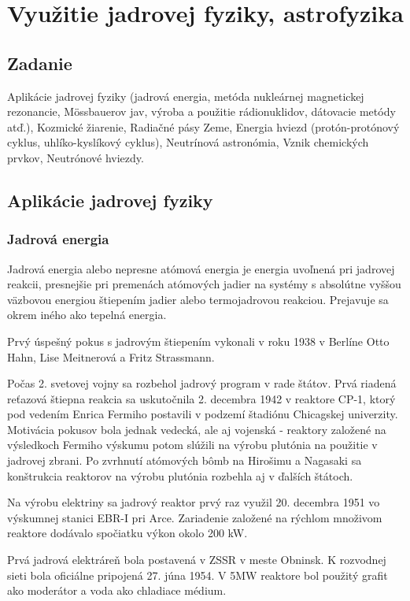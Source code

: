 \documentclass[../../main.tex]{subfiles}
\begin{document}
\chapter{Využitie jadrovej fyziky, astrofyzika}

\section{Zadanie}

Aplikácie jadrovej fyziky (jadrová energia, metóda nukleárnej magnetickej rezonancie, Mössbauerov jav, výroba a použitie rádionuklidov, dátovacie metódy atď.), Kozmické žiarenie, Radiačné pásy Zeme, Energia hviezd (protón-protónový cyklus, uhlíko-kyslíkový cyklus), Neutrínová astronómia, Vznik chemických prvkov, Neutrónové hviezdy.

\section{Aplikácie jadrovej fyziky}

\subsection{Jadrová energia}

Jadrová energia alebo nepresne atómová energia je energia uvoľnená pri jadrovej reakcii, presnejšie pri premenách atómových jadier na systémy s absolútne vyššou väzbovou energiou štiepením jadier alebo termojadrovou reakciou. Prejavuje sa okrem iného ako tepelná energia.

Prvý úspešný pokus s jadrovým štiepením vykonali v roku 1938 v Berlíne Otto Hahn, Lise Meitnerová a Fritz Strassmann.

Počas 2. svetovej vojny sa rozbehol jadrový program v rade štátov. Prvá riadená reťazová štiepna reakcia sa uskutočnila 2. decembra 1942 v reaktore CP-1, ktorý pod vedením Enrica Fermiho postavili v podzemí štadiónu Chicagskej univerzity. Motivácia pokusov bola jednak vedecká, ale aj vojenská - reaktory založené na výsledkoch Fermiho výskumu potom slúžili na výrobu plutónia na použitie v jadrovej zbrani. Po zvrhnutí atómových bômb na Hirošimu a Nagasaki sa konštrukcia reaktorov na výrobu plutónia rozbehla aj v ďalších štátoch.

Na výrobu elektriny sa jadrový reaktor prvý raz využil 20. decembra 1951 vo výskumnej stanici EBR-I pri Arce. Zariadenie založené na rýchlom množivom reaktore dodávalo spočiatku výkon okolo 200 kW.

Prvá jadrová elektráreň bola postavená v ZSSR v meste Obninsk. K rozvodnej sieti bola oficiálne pripojená 27. júna 1954. V 5MW reaktore bol použitý grafit ako moderátor a voda ako chladiace médium.
\end{document}

